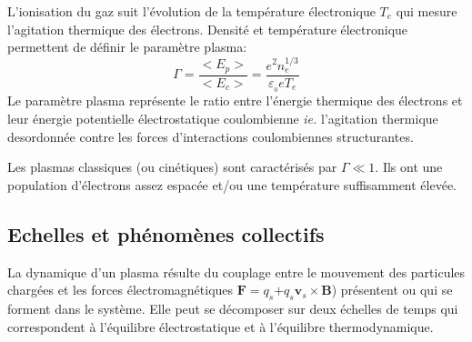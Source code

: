 			L'ionisation du gaz suit l'évolution de la température électronique $T_e$ qui
			mesure l'agitation thermique des électrons. Densité et température
			électronique permettent de définir le paramètre plasma:
			\begin{equation}
				\Gamma=\frac{<E_p>}{<E_c>}=\frac{e^2n_e^{1/3}}{\varepsilon_{_0} eT_e}
			\end{equation}
			Le paramètre plasma représente le ratio entre l'énergie thermique des
			électrons et leur énergie potentielle électrostatique coulombienne \emph{ie.}
			l'agitation thermique desordonnée contre les forces d'interactions
			coulombiennes structurantes. 
			
			Les plasmas classiques (ou cinétiques) sont caractérisés par
			$\Gamma\ll 1$. Ils ont une population d'électrons assez espacée et/ou une
			température suffisamment élevée.
			
		\subsection{Echelles et phénomènes collectifs}
		La dynamique d'un plasma résulte du couplage entre le mouvement des
		particules chargées et les forces électromagnétiques $\mathbf
		F=q_s\mathbf + q_s\mathbf v_s\times\mathbf B$)
		présentent ou qui se forment dans le système.
		Elle peut se décomposer sur deux échelles de temps qui correspondent à l'équilibre électrostatique
		et à l'équilibre thermodynamique.
